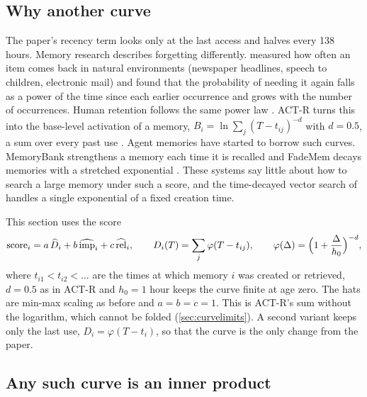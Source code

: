 
\subsection{Why another curve}

The paper's recency term looks only at the last access and halves every 138 hours. Memory research describes forgetting differently. \citet{anderson1991reflections} measured how often an item comes back in natural environments (newspaper headlines, speech to children, electronic mail) and found that the probability of needing it again falls as a power of the time since each earlier occurrence and grows with the number of occurrences. Human retention follows the same power law \citep{wixted1991form}. ACT-R turns this into the base-level activation of a memory, $B_i=\ln\sum_j (T-t_{ij})^{-d}$ with $d=0.5$, a sum over every past use \citep{anderson2004integrated}. Agent memories have started to borrow such curves. MemoryBank strengthens a memory each time it is recalled \citep{zhong2024memorybank} and FadeMem decays memories with a stretched exponential \citep{wei2026fademem}. These systems say little about how to search a large memory under such a score, and the time-decayed vector search of \citet{wei2026tango} handles a single exponential of a fixed creation time.

This section uses the score
\begin{equation}
\mathrm{score}_i = a\,\widehat{D}_i + b\,\widehat{\mathrm{imp}}_i + c\,\widehat{\mathrm{rel}}_i,\qquad
D_i(T)=\sum_j \varphi(T-t_{ij}),\qquad \varphi(\Delta)=\Bigl(1+\frac{\Delta}{h_0}\Bigr)^{-d},
\label{eq:curvescore}
\end{equation}
where $t_{i1}<t_{i2}<\dots$ are the times at which memory $i$ was created or retrieved, $d=0.5$ as in ACT-R and $h_0=1$ hour keeps the curve finite at age zero. The hats are min-max scaling as before and $a=b=c=1$. This is ACT-R's sum without the logarithm, which cannot be folded (\cref{sec:curvelimits}). A second variant keeps only the last use, $D_i=\varphi(T-t_i)$, so that the curve is the only change from the paper.

\subsection{Any such curve is an inner product}

